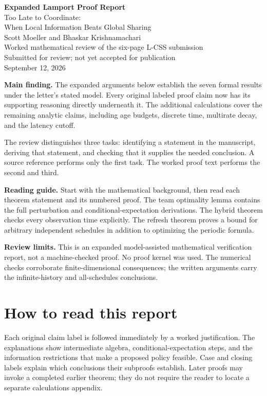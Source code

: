 \documentclass[12pt,letterpaper]{article}
\begin{document}
\begin{center}
{\LARGE\bfseries\textcolor{ink}{Expanded Lamport Proof Report}}\\[12pt]
{\Large Too Late to Coordinate:\\When Local Information Beats Global Sharing}\\[12pt]
{\large Scott Moeller and Bhaskar Krishnamachari}\\[8pt]
Worked mathematical review of the six-page L-CSS submission\\[3pt]
Submitted for review; not yet accepted for publication\\[5pt]
September 12, 2026
\end{center}
\bigskip
\textbf{Main finding.} The expanded arguments below establish the seven formal results under the letter's stated model. Every original labeled proof claim now has its supporting reasoning directly underneath it. The additional calculations cover the remaining analytic claims, including age budgets, discrete time, multirate decay, and the latency cutoff.

The review distinguishes three tasks: identifying a statement in the manuscript, deriving that statement, and checking that it supplies the needed conclusion. A source reference performs only the first task. The worked proof text performs the second and third.

\textbf{Reading guide.} Start with the mathematical background, then read each theorem statement and its numbered proof. The team optimality lemma contains the full perturbation and conditional-expectation derivations. The hybrid theorem checks every observation time explicitly. The refresh theorem proves a bound for arbitrary independent schedules in addition to optimizing the periodic formula.

\textbf{Review limits.} This is an expanded model-assisted mathematical verification report, not a machine-checked proof. No proof kernel was used. The numerical checks corroborate finite-dimensional consequences; the written arguments carry the infinite-history and all-schedules conclusions.
\clearpage
\tableofcontents
\clearpage

\section{How to read this report}
Each original claim label is followed immediately by a worked justification. The explanations show intermediate algebra, conditional-expectation steps, and the information restrictions that make a proposed policy feasible. Case and closing labels explain which conclusions their subproofs establish. Later proofs may invoke a completed earlier theorem; they do not require the reader to locate a separate calculations appendix.
\end{document}
